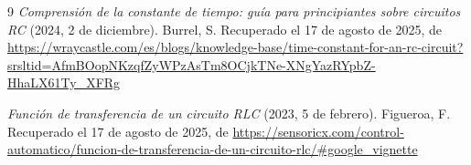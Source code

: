 \documentclass[12pt, letterpaper]{article}
\begin{document}
\begin{thebibliography}{9}
    \bibitem{} 
    \textit{Comprensión de la constante de tiempo: guía para principiantes sobre circuitos RC} (2024, 2 de diciembre). Burrel, S. Recuperado el 17 de agosto de 2025, de \url{https://wraycastle.com/es/blogs/knowledge-base/time-constant-for-an-rc-circuit?srsltid=AfmBOopNKzqfZyWPzAsTm8OCjkTNe-XNgYazRYpbZ-HhaLX61Ty_XFRg}

    \bibitem{} 
    \textit{Función de transferencia de un circuito RLC} (2023, 5 de febrero). Figueroa, F. Recuperado el 17 de agosto de 2025, de \url{https://sensoricx.com/control-automatico/funcion-de-transferencia-de-un-circuito-rlc/#google_vignette}
\end{thebibliography}
\end{document}
